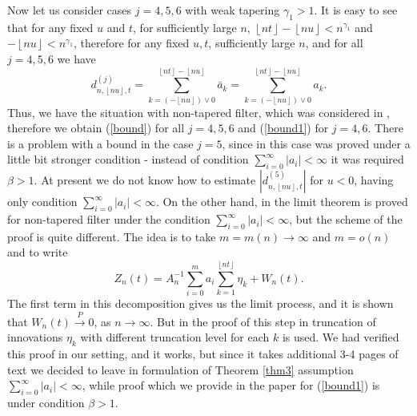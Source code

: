 \documentclass[12pt]{article}
\def\b{\beta}
\def\g{\gamma}
\def\pc{\stackrel{P}{\longrightarrow}}
\newcommand{\sv}[1]{\left\lfloor #1 \right\rfloor}
\theoremstyle{plain}
\theoremstyle{definition}
\begin{document}
Now let us consider cases $j=4, 5, 6$ with weak tapering $\g_1>1$. It is easy to see that for any fixed $u$ and $t$, for sufficiently large $n$,  $\sv{nt}-\sv{nu}<n^{\g_1}$ and $ -\sv{nu}<n^{\g_1}$, therefore for any fixed $u, t$,  sufficiently large $n$, and for all $j=4, 5, 6$ we have
$$
d_{n, \sv{nu}, t}^{(j)}=\sum_{k=\left( -\sv{nu} \right)\vee 0 }^{\sv{nt}-\sv{nu}}{\bar a}_{k}=\sum_{k=\left( -\sv{nu} \right)\vee 0 }^{\sv{nt}-\sv{nu}}a_{k}.
$$
Thus, we have the situation with non-tapered filter, which was considered in \cite{PaulDam4}, therefore we obtain (\ref{bound}) for all $j=4, 5, 6$ and (\ref{bound1}) for $j=4, 6$. There is a problem with a bound in the case $j=5$, since in \cite{PaulDam4} this case was proved under a little bit stronger condition - instead of condition $\sum_{i=0}^\infty |a_i|<\infty$ it was required $\b>1$. At present we do not know how to estimate $|d_{n, \sv{nu}, t}^{(5)}|$ for $u<0$, having only condition $\sum_{i=0}^\infty |a_i|<\infty$. On the other hand, in \cite{Astrauskas} the limit theorem is proved for non-tapered filter under the condition $\sum_{i=0}^\infty |a_i|<\infty$, but the scheme of the proof is quite different. The idea is to take $m=m(n)\to \infty$ and $m=o(n)$ and to write
$$
Z_n (t)=A_n^{-1}\sum_{i=0}^m a_i \sum_{k=1}^{\sv{nt}}\eta_k +W_n(t).
$$
The first term in this decomposition gives us the limit process, and it is shown that $W_n(t)\pc 0$, as $n\to \infty$. But in the proof of this step  in \cite{Astrauskas}  truncation of innovations $\eta_k$ with different truncation level for each $k$ is used. We had verified this proof in our setting, and it works, but since it takes additional 3-4 pages of text we decided to leave in formulation of Theorem \ref{thm3}  assumption $\sum_{i=0}^\infty |a_i|<\infty$, while proof which we provide in the paper for (\ref{bound1}) is under condition $\b>1$.
\end{document}
